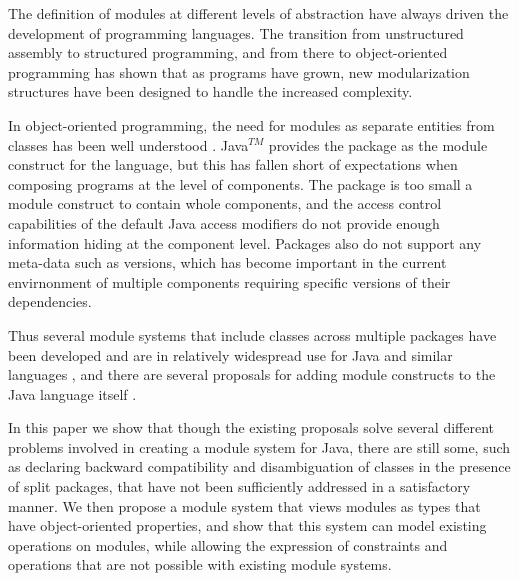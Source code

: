 The definition of modules at different levels of abstraction
have always driven the development of programming languages.
The transition from unstructured assembly to structured programming,
and from there to object-oriented programming has shown that
as programs have grown, new modularization structures have
been designed to handle the increased complexity.

In object-oriented programming, the need for modules as separate
entities from classes has been well understood \cite{szyperski92import}.
Java$^{TM}$ provides the package as the module construct for the language, but
this has fallen short of expectations when composing programs at
the level of components. The package is too small a module construct
to contain whole components, and the access control capabilities
of the default Java access modifiers do not provide enough
information hiding at the component level. Packages also do not
support any meta-data such as versions, which has become important
in the current envirnonment of multiple components requiring
specific versions of their dependencies.

Thus several module systems that include classes across multiple 
packages have been developed and are in relatively widespread use 
for Java and similar languages \cite{OSGi4, netassemblies}, and there are several
proposals for adding module constructs to the Java language itself
\cite{JSR294, JSR277}.

In this paper we show that though the existing proposals solve
several different problems involved in creating a module system
for Java, there are still some, such as declaring backward
compatibility and disambiguation of classes in the presence of
split packages, that have not been sufficiently addressed in a
satisfactory manner. We then propose a module system that
views modules as types that have object-oriented properties,
and show that this system can model existing operations on modules,
while allowing the expression of constraints and operations that
are not possible with existing module systems.